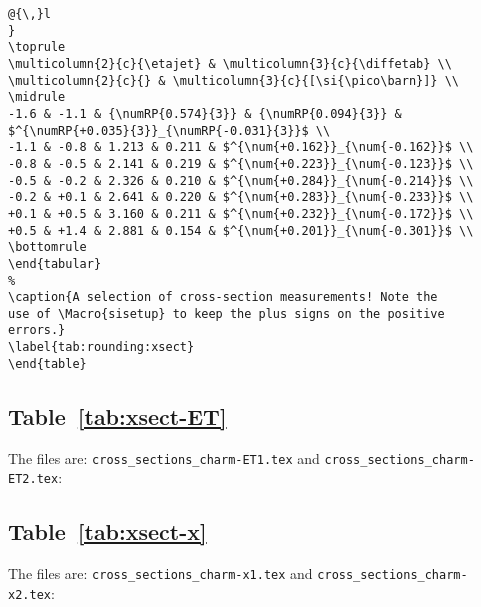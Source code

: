 \documentclass[UKenglish]{../../latex/atlasdoc}
\begin{document}
\begin{verbatim}
@{\,}l
}
\toprule
\multicolumn{2}{c}{\etajet} & \multicolumn{3}{c}{\diffetab} \\
\multicolumn{2}{c}{} & \multicolumn{3}{c}{[\si{\pico\barn}]} \\
\midrule
-1.6 & -1.1 & {\numRP{0.574}{3}} & {\numRP{0.094}{3}} & 
$^{\numRP{+0.035}{3}}_{\numRP{-0.031}{3}}$ \\
-1.1 & -0.8 & 1.213 & 0.211 & $^{\num{+0.162}}_{\num{-0.162}}$ \\
-0.8 & -0.5 & 2.141 & 0.219 & $^{\num{+0.223}}_{\num{-0.123}}$ \\
-0.5 & -0.2 & 2.326 & 0.210 & $^{\num{+0.284}}_{\num{-0.214}}$ \\
-0.2 & +0.1 & 2.641 & 0.220 & $^{\num{+0.283}}_{\num{-0.233}}$ \\
+0.1 & +0.5 & 3.160 & 0.211 & $^{\num{+0.232}}_{\num{-0.172}}$ \\
+0.5 & +1.4 & 2.881 & 0.154 & $^{\num{+0.201}}_{\num{-0.301}}$ \\
\bottomrule
\end{tabular}
%
\caption{A selection of cross-section measurements! Note the
use of \Macro{sisetup} to keep the plus signs on the positive
errors.}
\label{tab:rounding:xsect}
\end{table}
\end{verbatim}

\subsection{Table~\protect\ref{tab:xsect-ET}}
The files are: \texttt{cross\_sections\_charm-ET1.tex} and 
\texttt{cross\_sections\_charm-ET2.tex}:
{\scriptsize
  
}
{\scriptsize
  
}

\subsection{Table~\protect\ref{tab:xsect-x}}

The files are: \texttt{cross\_sections\_charm-x1.tex} and 
\texttt{cross\_sections\_charm-x2.tex}:
{\scriptsize
  
}
{\tiny
  
}
\end{document}
